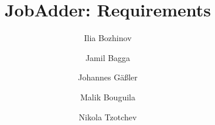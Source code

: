 \documentclass[a4paper,10pt]{scrreprt}
\title{JobAdder: Requirements}
\author{Ilia Bozhinov \and Jamil Bagga \and Johannes Gäßler \and Malik Bouguila \and Nikola Tzotchev}
\begin{document}
\maketitle
\tableofcontents
\newpage









\newpage



\printunsrtglossaries
\end{document}
